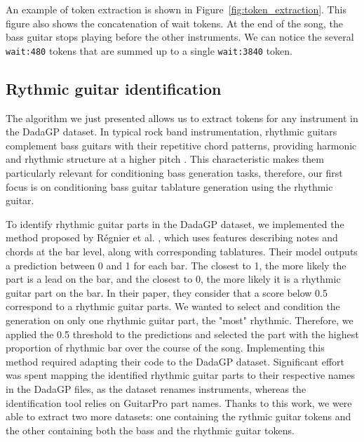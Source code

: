 An example of token extraction is shown in Figure~\ref{fig:token_extraction}.
This figure also shows the concatenation of wait tokens.
At the end of the song, the bass guitar stops playing before the other instruments.
We can notice the several \texttt{wait:480} tokens that are summed up to a single \texttt{wait:3840} token.

\subsection{Rythmic guitar identification}

The algorithm we just presented allows us to extract tokens for any instrument in the DadaGP dataset.
In typical rock band instrumentation, rhythmic guitars complement bass guitars with their repetitive chord patterns, providing harmonic and rhythmic structure at a higher pitch \cite{regnier_identification_2021}.
This characteristic makes them particularly relevant for conditioning bass generation tasks, therefore, our first focus is on conditioning bass guitar tablature generation using the rhythmic guitar.


To identify rhythmic guitar parts in the DadaGP dataset, we implemented the method proposed by Régnier et al. \cite{regnier_identification_2021},
which uses features describing notes and chords at the bar level, along with corresponding tablatures.
Their model outputs a prediction between 0 and 1 for each bar. The closest to 1, the more likely the part is a lead on the bar, and the closest to 0, the more likely it is a rhythmic guitar part on the bar.
In their paper, they consider that a score below 0.5 correspond to a rhythmic guitar parts. We wanted to select and condition the generation on only one rhythmic guitar part, the "most" rhythmic.
Therefore, we applied the 0.5 threshold to the predictions and selected the part with the highest proportion of rhythmic bar over the course of the song.
Implementing this method required adapting their code to the DadaGP dataset.
Significant effort was spent mapping the identified rhythmic guitar parts to their respective names in the DadaGP files, as the dataset renames instruments, whereas the identification tool relies on GuitarPro part names.
Thanks to this work, we were able to extract two more datasets: one containing the rythmic guitar tokens and the other containing both the bass and the rhythmic guitar tokens.
